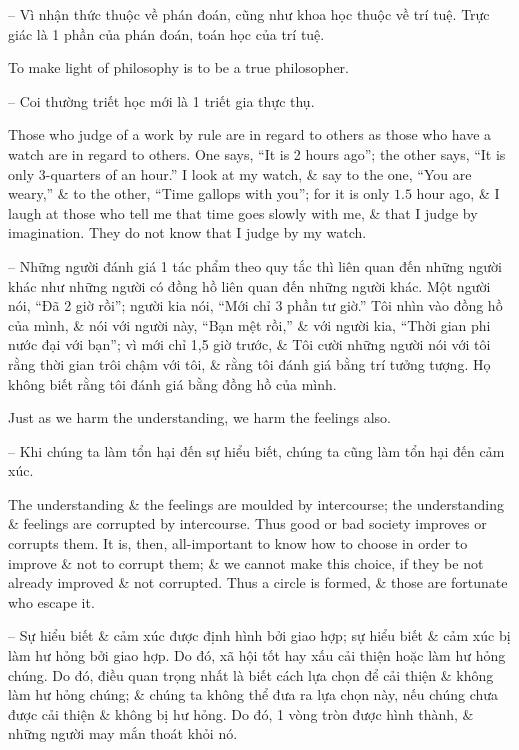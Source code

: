 \documentclass{article}
\begin{document}
\begin{enumerate}
\begin{itemize}
		-- Vì nhận thức thuộc về phán đoán, cũng như khoa học thuộc về trí tuệ. Trực giác là 1 phần của phán đoán, toán học của trí tuệ.
		
		To make light of philosophy is to be a true philosopher.
		
		-- Coi thường triết học mới là 1 triết gia thực thụ.
		
		 Those who judge of a work by rule are in regard to others as those who have a watch are in regard to others. One says, ``It is 2 hours ago''; the other says, ``It is only 3-quarters of an hour.'' I look at my watch, \& say to the one, ``You are weary,'' \& to the other, ``Time gallops with you''; for it is only $1.5$ hour ago, \& I laugh at those who tell me that time goes slowly with me, \& that I judge by imagination. They do not know that I judge by my watch.
		
		-- Những người đánh giá 1 tác phẩm theo quy tắc thì liên quan đến những người khác như những người có đồng hồ liên quan đến những người khác. Một người nói, ``Đã 2 giờ rồi''; người kia nói, ``Mới chỉ 3 phần tư giờ.'' Tôi nhìn vào đồng hồ của mình, \& nói với người này, ``Bạn mệt rồi,'' \& với người kia, ``Thời gian phi nước đại với bạn''; vì mới chỉ 1,5 giờ trước, \& Tôi cười những người nói với tôi rằng thời gian trôi chậm với tôi, \& rằng tôi đánh giá bằng trí tưởng tượng. Họ không biết rằng tôi đánh giá bằng đồng hồ của mình.
		
		 Just as we harm the understanding, we harm the feelings also.
		
		-- Khi chúng ta làm tổn hại đến sự hiểu biết, chúng ta cũng làm tổn hại đến cảm xúc.
		
		The understanding \& the feelings are moulded by intercourse; the understanding \& feelings are corrupted by intercourse. Thus good or bad society improves or corrupts them. It is, then, all-important to know how to choose in order to improve \& not to corrupt them; \& we cannot make this choice, if they be not already improved \& not corrupted. Thus a circle is formed, \& those are fortunate who escape it.
		
		-- Sự hiểu biết \& cảm xúc được định hình bởi giao hợp; sự hiểu biết \& cảm xúc bị làm hư hỏng bởi giao hợp. Do đó, xã hội tốt hay xấu cải thiện hoặc làm hư hỏng chúng. Do đó, điều quan trọng nhất là biết cách lựa chọn để cải thiện \& không làm hư hỏng chúng; \& chúng ta không thể đưa ra lựa chọn này, nếu chúng chưa được cải thiện \& không bị hư hỏng. Do đó, 1 vòng tròn được hình thành, \& những người may mắn thoát khỏi nó.
		

\end{itemize}
\end{enumerate}
\end{document}
